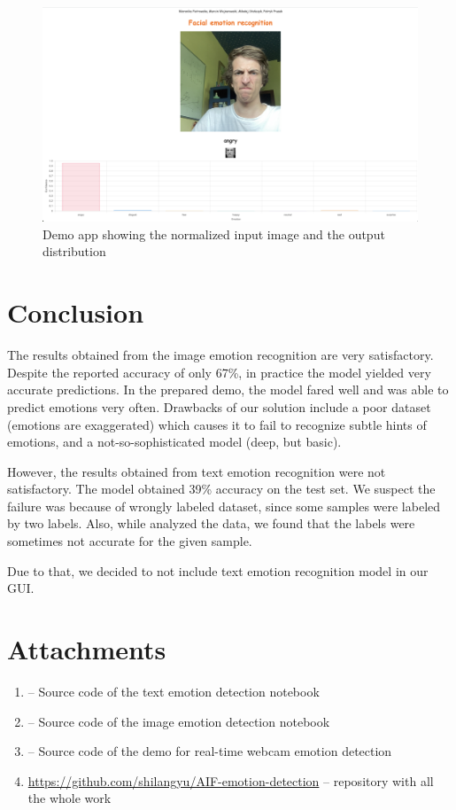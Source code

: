 \documentclass{ledger}
\begin{document}
\begin{figure}[H]
	\centering
	\includegraphics[width=1\textwidth]{assets/demo-debug.png}
	\caption{Demo app showing the normalized input image and the output distribution}
	\label{fig:demo-debug}
\end{figure}

\section{Conclusion}

The results obtained from the image emotion recognition are very satisfactory. Despite the reported accuracy of only 67\%, in practice the model yielded very accurate predictions. In the prepared demo, the model fared well and was able to predict emotions very often. Drawbacks of our solution include a poor dataset (emotions are exaggerated) which causes it to fail to recognize subtle hints of emotions, and a not-so-sophisticated model (deep, but basic).

\hfill

However, the results obtained from text emotion recognition were not satisfactory. The model obtained 39\% accuracy on the test set. We suspect the failure was because of wrongly labeled dataset, since some samples were labeled by two labels. Also, while analyzed the data, we found that the labels were sometimes not accurate for the given sample.

Due to that, we decided to not include text emotion recognition model in our GUI.

\section{Attachments}

\begin{enumerate}
	\item { -- Source code of the text emotion detection notebook}
	\item { -- Source code of the image emotion detection notebook}
	\item { -- Source code of the demo for real-time webcam emotion detection}
	      \item{} \url{https://github.com/shilangyu/AIF-emotion-detection} -- repository with all the whole work
\end{enumerate}




\end{document}
